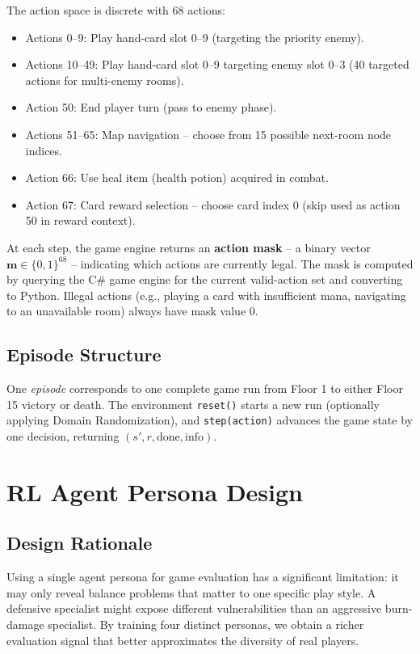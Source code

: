 The action space is discrete with 68 actions:
\begin{itemize}
    \item Actions 0--9: Play hand-card slot 0--9 (targeting the priority enemy).
    \item Actions 10--49: Play hand-card slot 0--9 targeting enemy slot 0--3 (40 targeted actions for multi-enemy rooms).
    \item Action 50: End player turn (pass to enemy phase).
    \item Actions 51--65: Map navigation -- choose from 15 possible next-room node indices.
    \item Action 66: Use heal item (health potion) acquired in combat.
    \item Action 67: Card reward selection -- choose card index 0 (skip used as action 50 in reward context).
\end{itemize}

At each step, the game engine returns an \textbf{action mask} -- a binary vector $\mathbf{m} \in \{0,1\}^{68}$ -- indicating which actions are currently legal. The mask is computed by querying the C\# game engine for the current valid-action set and converting to Python. Illegal actions (e.g., playing a card with insufficient mana, navigating to an unavailable room) always have mask value 0.

\subsection{Episode Structure}

One \textit{episode} corresponds to one complete game run from Floor 1 to either Floor 15 victory or death. The environment \texttt{reset()} starts a new run (optionally applying Domain Randomization), and \texttt{step(action)} advances the game state by one decision, returning $(s', r, \text{done}, \text{info})$.

\section{RL Agent Persona Design}

\subsection{Design Rationale}

Using a single agent persona for game evaluation has a significant limitation: it may only reveal balance problems that matter to one specific play style. A defensive specialist might expose different vulnerabilities than an aggressive burn-damage specialist. By training four distinct personas, we obtain a richer evaluation signal that better approximates the diversity of real players.

